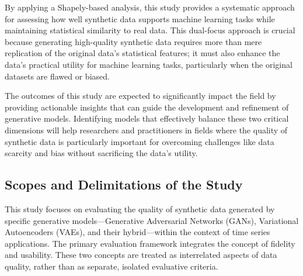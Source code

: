 \documentclass{article}
\begin{document}
By applying a Shapely-based analysis, this study provides a systematic approach for assessing how well synthetic data supports machine learning tasks while maintaining statistical similarity to real data. This dual-focus approach is crucial because generating high-quality synthetic data requires more than mere replication of the original data’s statistical features; it must also enhance the data's practical utility for machine learning tasks, particularly when the original datasets are flawed or biased.

The outcomes of this study are expected to significantly impact the field by providing actionable insights that can guide the development and refinement of generative models. Identifying models that effectively balance these two critical dimensions will help researchers and practitioners in fields where the quality of synthetic data is particularly important for overcoming challenges like data scarcity and bias without sacrificing the data’s utility.

\subsection{Scopes and Delimitations of the Study}
This study focuses on evaluating the quality of synthetic data generated by specific generative models—Generative Adversarial Networks (GANs), Variational Autoencoders (VAEs), and their hybrid—within the context of time series applications. The primary evaluation framework integrates the concept of fidelity and usability. These two concepts are treated as interrelated aspects of data quality, rather than as separate, isolated evaluative criteria.
\end{document}
